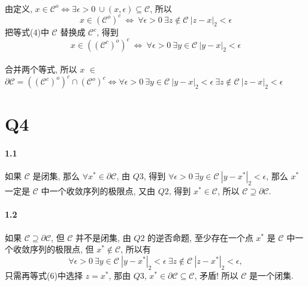 \documentclass{article}
\begin{document}
\begin{CJK}{UTF8}{gbsn}
  \paragraph{}
    由定义, $x \in \mathcal{C}^o \iff \exists \epsilon > 0\ \cup(x, \epsilon) \subseteq \mathcal{C}$, 所以
    \begin{equation}
      x \in (\mathcal{C}^o)^c\ \iff\ \forall \epsilon > 0\ \exists z \not\in \mathcal{C}\ |z - x|_2 < \epsilon
    \end{equation}
    把等式(4)中 $\mathcal{C}$ 替换成 $\mathcal{C}^c$, 得到
    \begin{equation}
      x \in ((\mathcal{C}^c)^o)^c\ \iff\ \forall \epsilon > 0\ \exists y \in \mathcal{C}\ |y - x|_2 < \epsilon
    \end{equation}
  \paragraph{}
    合并两个等式, 所以 $x$ $\in$ $\partial\mathcal{C} = ((\mathcal{C}^c)^o)^c \cap (\mathcal{C}^o)^c \iff \forall \epsilon > 0\ \exists y \in \mathcal{C}\ |y - x|_2 < \epsilon\ \exists z \not\in \mathcal{C}\ |z - x|_2 < \epsilon$

\section{Q4}
  \paragraph{1.1} 如果 $\mathcal{C}$ 是闭集,  那么 $\forall x^* \in \partial \mathcal{C}$, 由 $Q3$, 得到 $\forall \epsilon > 0\ \exists y \in \mathcal{C}\ |y - x^*|_2 < \epsilon$, 那么 $x^*$ 一定是 $\mathcal{C}$ 中一个收敛序列的极限点, 又由 $Q2$, 得到 $x^* \in \mathcal{C}$, 所以 $\mathcal{C} \supseteq \partial \mathcal{C}$.
  \paragraph{1.2} 如果 $\mathcal{C} \supseteq \partial \mathcal{C}$, 但 $\mathcal{C}$ 并不是闭集, 由 $Q2$ 的逆否命题, 至少存在一个点 $x^*$ 是 $\mathcal{C}$ 中一个收敛序列的极限点, 但 $x^* \not\in \mathcal{C}$, 所以有
  \begin{equation}
    \forall \epsilon > 0\ \exists y \in \mathcal{C}\ |y - x^*|_2 < \epsilon\ \exists z \not\in \mathcal{C}\ |z - x^*|_2 < \epsilon,
  \end{equation}
  只需再等式(6)中选择 $z = x^*$, 那由 $Q3$, $x^* \in \partial \mathcal{C} \subseteq \mathcal{C}$, 矛盾! 所以 $\mathcal{C}$ 是一个闭集.

\end{CJK}
\end{document}
